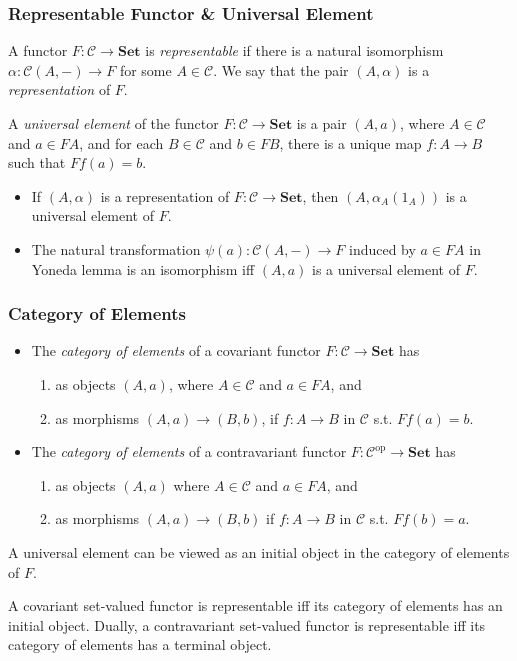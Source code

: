 \documentclass[UTF8,aspectratio=43,11pt,colorlinks,compress,openany]{beamer}%
\begin{document}
\begin{frame}\frametitle{Representable Functor \& Universal Element}
\begin{definition}
A functor $F:\mathcal{C}\to\mathbf{Set}$ is \emph{representable} if there is a natural isomorphism $\alpha:\mathcal{C}(A,-)\to F$ for some $A\in\mathcal{C}$. We say that the pair $(A,\alpha)$ is a \emph{representation} of $F$.
\end{definition}
\begin{definition}
	A \emph{universal element} of the functor $F:\mathcal{C}\to\mathbf{Set}$ is a pair $(A,a)$, where $A\in\mathcal{C}$ and $a\in FA$, and for each $B\in\mathcal{C}$ and $b\in FB$, there is a unique map $f: A\to B$ such that $Ff(a)=b$.
\end{definition}
\begin{itemize}
	\item If $(A,\alpha)$ is a representation of $F:\mathcal{C}\to\mathbf{Set}$, then $(A,\alpha_A(1_A))$ is a universal element of $F$.
	\item The natural transformation $\psi(a):\mathcal{C}(A,-)\to F$ induced by $a\in FA$ in Yoneda lemma is an isomorphism iff $(A,a)$ is a universal element of $F$.
\end{itemize}
\end{frame}

\begin{frame}\frametitle{Category of Elements}
\begin{definition}
	\begin{itemize}
		\item The \emph{category of elements} of a covariant functor $F:\mathcal{C}\to\mathbf{Set}$ has 
		\begin{enumerate}
			\item as objects $(A,a)$, where $A\in\mathcal{C}$ and $a\in FA$, and
			\item as morphisms $(A,a)\to(B,b)$, if $f: A\to B$ in $\mathcal{C}$ s.t. $Ff(a)=b$.
		\end{enumerate}
		\item The \emph{category of elements} of a contravariant functor $F:\mathcal{C}^\mathrm{op}\to\mathbf{Set}$ has 
		\begin{enumerate}
			\item as objects $(A,a)$ where $A\in\mathcal{C}$ and $a\in FA$, and
			\item as morphisms $(A,a)\to(B,b)$ if $f: A\to B$ in $\mathcal{C}$ s.t. $Ff(b)=a$.
		\end{enumerate}
	\end{itemize}
\end{definition}
A universal element can be viewed as an initial object in the category of elements of $F$.
\begin{theorem}
A covariant set-valued functor is representable iff its category of elements has an initial object. Dually, a contravariant set-valued functor is representable iff its category of elements has a terminal object.
\end{theorem}
\end{frame}
\end{document}
